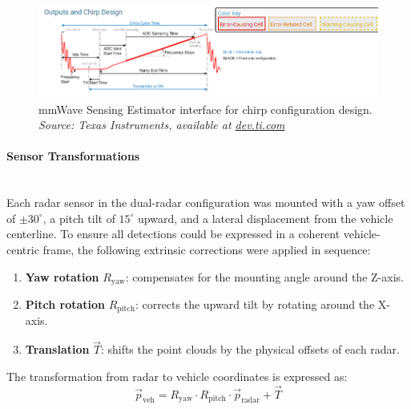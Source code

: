 \begin{figure}[!htbp]
    \centering
    \includegraphics[width=0.9\linewidth]{images/sensingEstimatorChirp.png}
    \caption{mmWave Sensing Estimator interface for chirp configuration design.\\
    \textit{Source: Texas Instruments, available at \href{https://dev.ti.com/gallery/view/mmwave/mmWaveSensingEstimator/ver/2.5.1/}{dev.ti.com}}}
    \label{fig:mmwave_sensing_estimator}
\end{figure}

\vspace{0.5em}
\paragraph{Sensor Transformations}
\hfill
\\
Each radar sensor in the dual-radar configuration was mounted with a yaw offset of $\pm30^\circ$, a pitch tilt of $15^\circ$ upward, and a lateral displacement from the vehicle centerline.  
To ensure all detections could be expressed in a coherent vehicle-centric frame, the following extrinsic corrections were applied in sequence:

\begin{enumerate}
    \item \textbf{Yaw rotation} $R_{\text{yaw}}$: compensates for the mounting angle around the Z-axis.  
    \item \textbf{Pitch rotation} $R_{\text{pitch}}$: corrects the upward tilt by rotating around the X-axis.  
    \item \textbf{Translation} $\vec{T}$: shifts the point clouds by the physical offsets of each radar.
\end{enumerate}

The transformation from radar to vehicle coordinates is expressed as:
\begin{equation}
    \vec{p}_{\text{veh}} = R_{\text{yaw}} \cdot R_{\text{pitch}} \cdot \vec{p}_{\text{radar}} + \vec{T}
    \label{eq:radar_to_vehicle_transform_short}
\end{equation}

